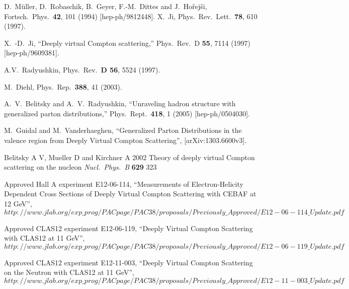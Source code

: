   D.~Müller, D.~Robaschik, B.~Geyer, F.-M.~Dittes and J.~Hořejši,
  Fortsch.\ Phys.\  {\bf 42}, 101 (1994)
  [hep-ph/9812448].
X.~Ji, Phys.\ Rev.\ Lett.\ {\bf 78}, 610 (1997).

  X.~-D.~Ji,
  ``Deeply virtual Compton scattering,''
  Phys.\ Rev.\ D {\bf 55}, 7114 (1997)
  [hep-ph/9609381].

A.V.~Radyushkin, Phys.\ Rev.\ {\bf D 56}, 5524 (1997).
 
M.~Diehl, Phys.\ Rep.\ {\bf 388}, 41 (2003).

  A.~V.~Belitsky and A.~V.~Radyushkin,
  ``Unraveling hadron structure with generalized parton distributions,''
  Phys.\ Rept.\  {\bf 418}, 1 (2005)
  [hep-ph/0504030].
  
  M.~Guidal and M.~Vanderhaeghen,
  ``Generalized Parton Distributions in the valence region from Deeply Virtual Compton Scattering'',
  [arXiv:1303.6600v3].
     
  Belitsky A V, Mueller D and Kirchner A 2002
  Theory of deeply virtual Compton scattering on the nucleon 
  {\it Nucl.\ Phys.\  B} {\bf 629} 323  

  
  Approved Hall A experiment E12-06-114,
  ``Measurements of Electron-Helicity Dependent Cross Sections of Deeply Virtual Compton Scattering with CEBAF at 12 GeV'',\\
$http://www.jlab.org/exp\_prog/PACpage/PAC38/proposals/Previously\_Approved/E12-06-114\_Update.pdf$
      
  Approved CLAS12 experiment E12-06-119,
  ``Deeply Virtual Compton Scattering with CLAS12 at 11 GeV'',\\
$http://www.jlab.org/exp\_prog/PACpage/PAC38/proposals/Previously\_Approved/E12-06-119\_Update.pdf$
  
  Approved CLAS12 experiment E12-11-003,
  ``Deeply Virtual Compton Scattering on the Neutron with CLAS12 at 11 GeV'',\\
$http://www.jlab.org/exp\_prog/PACpage/PAC38/proposals/Previously\_Approved/E12-11-003\_Update.pdf$

